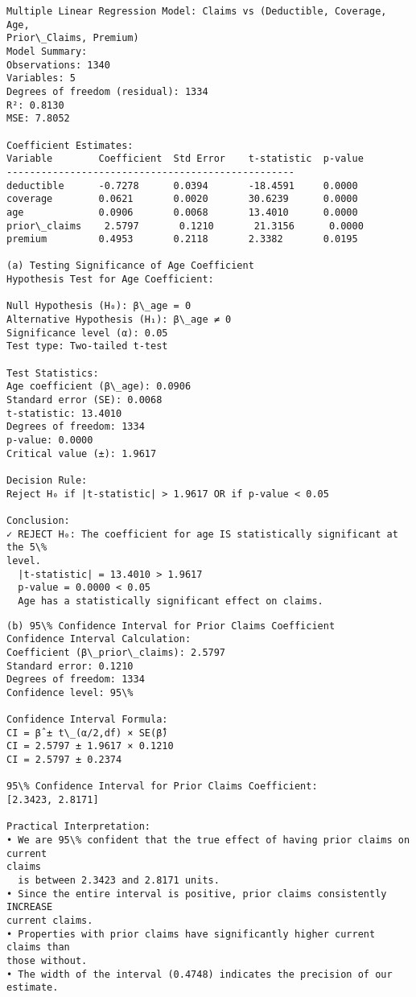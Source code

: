 \documentclass[8pt, twocolumn]{extarticle}
\begin{document}
    \begin{Verbatim}[commandchars=\\\{\}]
Multiple Linear Regression Model: Claims vs (Deductible, Coverage, Age,
Prior\_Claims, Premium)
Model Summary:
Observations: 1340
Variables: 5
Degrees of freedom (residual): 1334
R²: 0.8130
MSE: 7.8052

Coefficient Estimates:
Variable        Coefficient  Std Error    t-statistic  p-value
--------------------------------------------------
deductible      -0.7278      0.0394       -18.4591     0.0000
coverage        0.0621       0.0020       30.6239      0.0000
age             0.0906       0.0068       13.4010      0.0000
prior\_claims    2.5797       0.1210       21.3156      0.0000
premium         0.4953       0.2118       2.3382       0.0195

(a) Testing Significance of Age Coefficient
Hypothesis Test for Age Coefficient:

Null Hypothesis (H₀): β\_age = 0
Alternative Hypothesis (H₁): β\_age ≠ 0
Significance level (α): 0.05
Test type: Two-tailed t-test

Test Statistics:
Age coefficient (β\_age): 0.0906
Standard error (SE): 0.0068
t-statistic: 13.4010
Degrees of freedom: 1334
p-value: 0.0000
Critical value (±): 1.9617

Decision Rule:
Reject H₀ if |t-statistic| > 1.9617 OR if p-value < 0.05

Conclusion:
✓ REJECT H₀: The coefficient for age IS statistically significant at the 5\%
level.
  |t-statistic| = 13.4010 > 1.9617
  p-value = 0.0000 < 0.05
  Age has a statistically significant effect on claims.
    \end{Verbatim}
    \begin{Verbatim}[commandchars=\\\{\}]
(b) 95\% Confidence Interval for Prior Claims Coefficient
Confidence Interval Calculation:
Coefficient (β\_prior\_claims): 2.5797
Standard error: 0.1210
Degrees of freedom: 1334
Confidence level: 95\%

Confidence Interval Formula:
CI = β̂ ± t\_(α/2,df) × SE(β̂)
CI = 2.5797 ± 1.9617 × 0.1210
CI = 2.5797 ± 0.2374

95\% Confidence Interval for Prior Claims Coefficient:
[2.3423, 2.8171]

Practical Interpretation:
• We are 95\% confident that the true effect of having prior claims on current
claims
  is between 2.3423 and 2.8171 units.
• Since the entire interval is positive, prior claims consistently INCREASE
current claims.
• Properties with prior claims have significantly higher current claims than
those without.
• The width of the interval (0.4748) indicates the precision of our estimate.
    \end{Verbatim}
\end{document}
